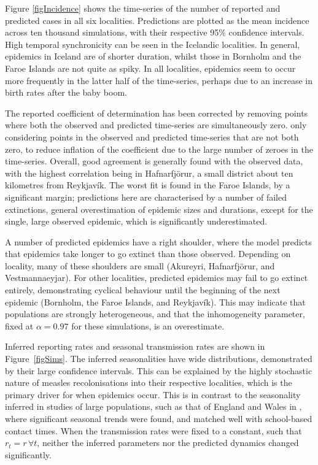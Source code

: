\documentclass[10pt]{article}
\begin{document}
Figure \ref{figIncidence} shows the time-series of the number of reported and predicted cases in all six localities. Predictions are plotted as the mean incidence across ten thousand simulations, with their respective 95\% confidence intervals. High temporal synchronicity can be seen in the Icelandic localities. In general, epidemics in Iceland are of shorter duration, whilst those in Bornholm and the Faroe Islands are not quite as spiky. In all localities, epidemics seem to occur more frequently in the latter half of the time-series, perhaps due to an increase in birth rates after the baby boom. 

The reported coefficient of determination has been corrected by removing points where both the observed and predicted time-series are simultaneously zero. only considering points in the observed and predicted time-series that are not both zero, to reduce inflation of the coefficient due to the large number of zeroes in the time-series. Overall, good agreement is generally found with the observed data, with the highest correlation being in Hafnarfj\"{o}r\dh{}ur, a small district about ten kilometres from Reykjav\'{i}k. The worst fit is found in the Faroe Islands, by a significant margin; predictions here are characterised by a number of failed extinctions, general overestimation of epidemic sizes and durations, except for the single, large observed epidemic, which is significantly underestimated. 

A number of predicted epidemics have a right shoulder, where the model predicts that epidemics take longer to go extinct than those observed. Depending on locality, many of these shoulders are small (Akureyri, Hafnarfj\"{o}r\dh{}ur, and Vestmannaeyjar). For other localities, predicted epidemics may fail to go extinct entirely, demonstrating cyclical behaviour until the beginning of the next epidemic (Bornholm, the Faroe Islands, and Reykjav\'{i}k). This may indicate that populations are strongly heterogeneous, and that the inhomogeneity parameter, fixed at $\alpha=0.97$ for these simulations, is an overestimate.

Inferred reporting rates and seasonal transmission rates are shown in Figure~\ref{figSims}. The inferred seasonalities have wide distributions, demonstrated by their large confidence intervals. This can be explained by the highly stochastic nature of measles recolonisations into their respective localities, which is the primary driver for when epidemics occur. This is in contrast to the seasonality inferred in studies of large populations, such as that of England and Wales in \cite{Finkenstadt2000}, where significant seasonal trends were found, and matched well with school-based contact times. When the transmission rates were fixed to a constant, such that $r_t = r \, \forall t$, neither the inferred parameters nor the predicted dynamics changed significantly. 
\end{document}
